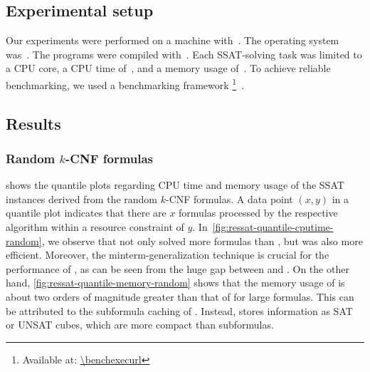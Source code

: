 \subsection{Experimental setup}
Our experiments were performed on a machine with~\machineSpec.
The operating system was~\osInfo.
The programs were compiled with~\compiler.
Each SSAT-solving task was limited to a CPU core,
a CPU time of~\timelimit,
and a memory usage of~\memlimit.
To achieve reliable benchmarking,
we used a benchmarking framework \benchexec\footnote{Available at: \url{\benchexecurl}}~\cite{Benchmarking-STTT}.

\subsection{Results}

\subsubsection{Random $k$-CNF formulas}

 shows the quantile plots regarding CPU time and memory usage
of the SSAT instances derived from the random $k$-CNF formulas.
A data point $(x,y)$ in a quantile plot indicates that
there are $x$ formulas processed by the respective algorithm within a resource constraint of $y$.
In~\cref{fig:ressat-quantile-cputime-random},
we observe that \ressat not only solved more formulas than \dcssat,
but was also more efficient.
Moreover, the minterm-generalization technique is crucial for the performance of \ressat,
as can be seen from the huge gap between \ressat and \ressatb.
On the other hand,
\cref{fig:ressat-quantile-memory-random} shows that the memory usage of \dcssat is about two orders of magnitude greater than that of \ressat for large formulas.
This can be attributed to the subformula caching of \dcssat.
Instead, \ressat stores information as SAT or UNSAT cubes,
which are more compact than subformulas.


